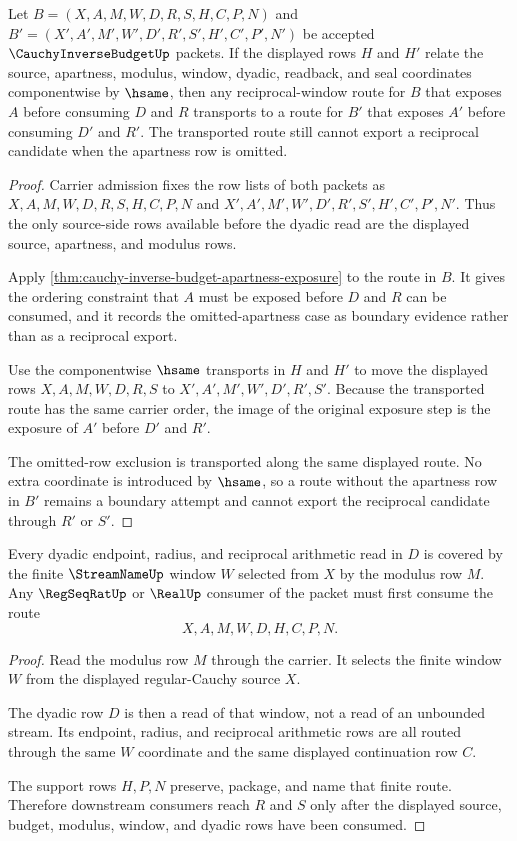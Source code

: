 \begin{theorem}
\label{thm:cauchy-inverse-budget-apartness-transport}
Let $B=(X,A,M,W,D,R,S,H,C,P,N)$ and $B'=(X',A',M',W',D',R',S',H',C',P',N')$ be accepted $\CauchyInverseBudgetUp$ packets. If the displayed rows $H$ and $H'$ relate the source, apartness, modulus, window, dyadic, readback, and seal coordinates componentwise by $\hsame$, then any reciprocal-window route for $B$ that exposes $A$ before consuming $D$ and $R$ transports to a route for $B'$ that exposes $A'$ before consuming $D'$ and $R'$. The transported route still cannot export a reciprocal candidate when the apartness row is omitted.
\end{theorem}
\begin{proof}
Carrier admission fixes the row lists of both packets as $X,A,M,W,D,R,S,H,C,P,N$ and $X',A',M',W',D',R',S',H',C',P',N'$. Thus the only source-side rows available before the dyadic read are the displayed source, apartness, and modulus rows.

Apply \autoref{thm:cauchy-inverse-budget-apartness-exposure} to the route in $B$. It gives the ordering constraint that $A$ must be exposed before $D$ and $R$ can be consumed, and it records the omitted-apartness case as boundary evidence rather than as a reciprocal export.

Use the componentwise $\hsame$ transports in $H$ and $H'$ to move the displayed rows $X,A,M,W,D,R,S$ to $X',A',M',W',D',R',S'$. Because the transported route has the same carrier order, the image of the original exposure step is the exposure of $A'$ before $D'$ and $R'$.

The omitted-row exclusion is transported along the same displayed route. No extra coordinate is introduced by $\hsame$, so a route without the apartness row in $B'$ remains a boundary attempt and cannot export the reciprocal candidate through $R'$ or $S'$.
\end{proof}

\begin{theorem}
\label{thm:cauchy-inverse-budget-window-coverage}
Every dyadic endpoint, radius, and reciprocal arithmetic read in $D$ is covered by the finite $\StreamNameUp$ window $W$ selected from $X$ by the modulus row $M$. Any $\RegSeqRatUp$ or $\RealUp$ consumer of the packet must first consume the route
$$
X,A,M,W,D,H,C,P,N.
$$
\end{theorem}
\begin{proof}
Read the modulus row $M$ through the carrier. It selects the finite window $W$ from the displayed regular-Cauchy source $X$.

The dyadic row $D$ is then a read of that window, not a read of an unbounded stream. Its endpoint, radius, and reciprocal arithmetic rows are all routed through the same $W$ coordinate and the same displayed continuation row $C$.

The support rows $H,P,N$ preserve, package, and name that finite route. Therefore downstream consumers reach $R$ and $S$ only after the displayed source, budget, modulus, window, and dyadic rows have been consumed.
\end{proof}

